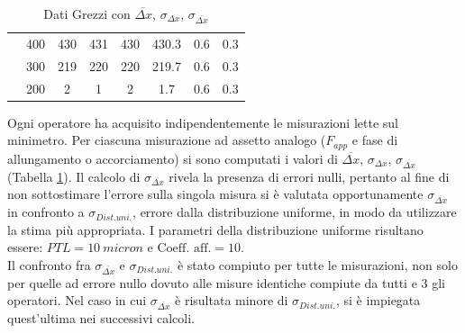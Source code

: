 \documentclass[a4paper,11pt,oneside]{article}
\begin{document}
\begin{table}[h!]
\begin{tabular}{|cc|c|c|c||c|c|c|}
        \multicolumn{1}{|c|}{}&{\cellcolor[rgb]{0.85,0.85,0.85}}400&	{\cellcolor[rgb]{0.85,0.85,0.85}}430&	{\cellcolor[rgb]{0.85,0.85,0.85}}431&	{\cellcolor[rgb]{0.85,0.85,0.85}}430&	{\cellcolor[rgb]{0.85,0.85,0.85}}430.3&	{\cellcolor[rgb]{0.85,0.85,0.85}}0.6&	{\cellcolor[rgb]{0.85,0.85,0.85}}0.3\\
        \multicolumn{1}{|c|}{}&300&	219&	220&	220&	219.7&	0.6&	0.3\\
        \multicolumn{1}{|c|}{}&{\cellcolor[rgb]{0.85,0.85,0.85}}200&	{\cellcolor[rgb]{0.85,0.85,0.85}}2&	{\cellcolor[rgb]{0.85,0.85,0.85}}1&	{\cellcolor[rgb]{0.85,0.85,0.85}}2&	{\cellcolor[rgb]{0.85,0.85,0.85}}1.7&	{\cellcolor[rgb]{0.85,0.85,0.85}}0.6&	{\cellcolor[rgb]{0.85,0.85,0.85}}0.3\\
        \hline
    \end{tabular}
    \caption{Dati Grezzi con $\overline{\Delta x}$, $\sigma_{\Delta x}$, $\sigma_{\overline{\Delta x}}$}
    \label{tab:dati_grezzi_1ac}
\end{table}

Ogni operatore ha acquisito indipendentemente le misurazioni lette sul minimetro. Per ciascuna misurazione ad assetto analogo ($F_{app}$ e fase di allungamento o accorciamento) si sono computati i valori di $\overline{\Delta x}$, $\sigma_{\Delta x}$, $\sigma_{\overline{\Delta x}}$ (Tabella \ref{tab:dati_grezzi_1ac}).
Il calcolo di $\sigma_{\overline{\Delta x}}$ rivela la presenza di errori nulli, pertanto al fine di non sottostimare l'errore sulla singola misura si è valutata opportunamente $\sigma_{\overline{\Delta x}}$ in confronto a $\sigma_{Dist. uni.}$, errore dalla distribuzione uniforme, in modo da utilizzare la stima più appropriata. I parametri della distribuzione uniforme risultano essere: $PTL= \SI{10}{micron}$ e $\text{Coeff. aff.}=\num{10}$.\\
Il confronto fra $\sigma_{\overline{\Delta x}}$ e $\sigma_{Dist. uni.}$ è stato compiuto per tutte le misurazioni, non solo per quelle ad errore nullo dovuto alle misure identiche compiute da tutti e 3 gli operatori. Nel caso in cui $\sigma_{\overline{\Delta x}}$ è risultata minore di $\sigma_{Dist. uni.}$, si è impiegata quest'ultima nei successivi calcoli.\\%
\end{document}

